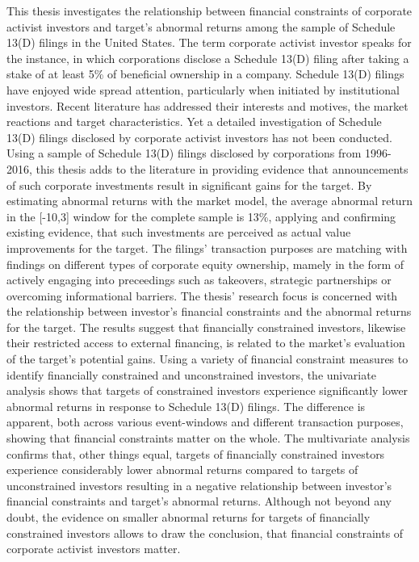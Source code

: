 \documentclass[12pt]{article}
\begin{document}
This thesis investigates the relationship between financial constraints of corporate activist investors and target's abnormal returns among the sample of Schedule 13(D) filings in the United States. The term corporate activist investor speaks for the instance, in which corporations disclose a Schedule 13(D) filing after taking a stake of at least 5\% of beneficial ownership in a company. Schedule 13(D) filings have enjoyed wide spread attention, particularly when initiated by institutional investors. Recent literature has addressed their interests and motives, the market reactions and target characteristics. Yet a detailed investigation of Schedule 13(D) filings disclosed by corporate activist investors has not been conducted. Using a sample of Schedule 13(D) filings disclosed by corporations from 1996-2016, this thesis adds to the literature in providing evidence that announcements of such corporate investments result in significant gains for the target. By estimating abnormal returns with the market model, the average abnormal return in the [-10,3] window for the complete sample is 13\%, applying and confirming existing evidence, that such investments are perceived as actual value improvements for the target. The filings' transaction purposes are matching with findings on different types of corporate equity ownership, mamely in the form of actively engaging into preceedings such as takeovers, strategic partnerships or overcoming informational barriers. The thesis' research focus is concerned with the relationship between investor's financial constraints and the abnormal returns for the target. The results suggest that financially constrained investors, likewise their restricted access to external financing, is related to the market's evaluation of the target's potential gains. Using a variety of financial constraint measures to identify financially constrained and unconstrained investors, the univariate analysis shows that targets of constrained investors experience significantly lower abnormal returns in response to Schedule 13(D) filings. The difference is apparent, both across various event-windows and different transaction purposes, showing that financial constraints matter on the whole. The multivariate analysis confirms that, other things equal, targets of financially constrained investors experience considerably lower abnormal returns compared to targets of unconstrained investors resulting in a negative relationship between investor's financial constraints and target's abnormal returns. Although not beyond any doubt, the evidence on smaller abnormal returns for targets of financially constrained investors allows to draw the conclusion, that financial constraints of corporate activist investors matter.\\ 
\end{document}
